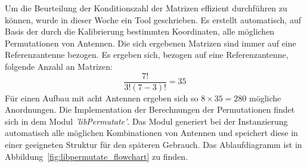 %

%
Um die Beurteilung der Konditionszahl der Matrizen effizient durchführen zu können, wurde in dieser Woche ein Tool geschrieben. Es erstellt automatisch, auf Basis der durch die Kalibrierung bestimmten Koordinaten, alle möglichen Permutationen von Antennen. Die sich ergebenen Matrizen sind immer auf eine Referenzantenne bezogen. Es ergeben sich, bezogen auf eine Referenzantenne, folgende Anzahl an Matrizen:
% 
\begin{equation}
\frac{7!}{3!(7-3)!}=35
\end{equation}
%
Für einen Aufbau mit acht Antennen ergeben sich so $8\times 35 = 280$ mögliche Anordnungen. Die Implementation der Berechnungen der Permutationen findet sich in dem Modul \textit{'libPermutate'}. Das Modul generiert bei der Instanzierung automatisch alle möglichen Kombinationen von Antennen und speichert diese in einer geeigneten Struktur für den späteren Gebrauch. Das Ablaufdiagramm ist in Abbildung~\ref{fig:libpermutate_flowchart} zu finden.\\






